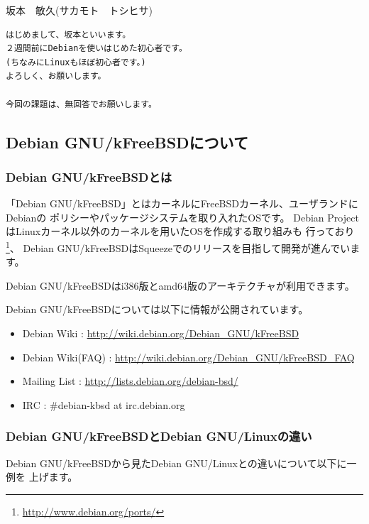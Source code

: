 \documentclass[mingoth,a4paper]{jsarticle}
\begin{document}
\begin{prework}{ 坂本　敏久(サカモト　トシヒサ) }

\begin{verbatim}
はじめまして、坂本といいます。
２週間前にDebianを使いはじめた初心者です。
(ちなみにLinuxもほぼ初心者です。)
よろしく、お願いします。

今回の課題は、無回答でお願いします。
\end{verbatim}

\end{prework}


\subsection{Debian GNU/kFreeBSDについて}

\subsubsection{Debian GNU/kFreeBSDとは}
「Debian GNU/kFreeBSD」とはカーネルにFreeBSDカーネル、ユーザランドにDebianの
ポリシーやパッケージシステムを取り入れたOSです。
Debian ProjectはLinuxカーネル以外のカーネルを用いたOSを作成する取り組みも
行っており\footnote{\url{http://www.debian.org/ports/}}、
Debian GNU/kFreeBSDはSqueezeでのリリースを目指して開発が進んでいます。


Debian GNU/kFreeBSDはi386版とamd64版のアーキテクチャが利用できます。

Debian GNU/kFreeBSDについては以下に情報が公開されています。

\begin{itemize}
 \item Debian Wiki      : \url{http://wiki.debian.org/Debian\_GNU/kFreeBSD}
 \item Debian Wiki(FAQ) : \url{http://wiki.debian.org/Debian\_GNU/kFreeBSD\_FAQ}
 \item Mailing List     : \url{http://lists.debian.org/debian-bsd/}
 \item IRC              : \#debian-kbsd at irc.debian.org
\end{itemize}

\subsubsection{Debian GNU/kFreeBSDとDebian GNU/Linuxの違い}
Debian GNU/kFreeBSDから見たDebian GNU/Linuxとの違いについて以下に一例を
上げます。
\end{document}
